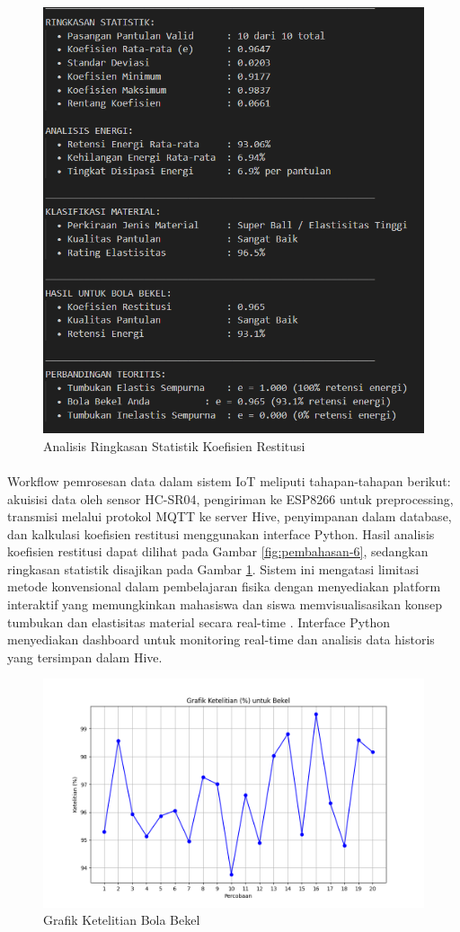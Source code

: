 \begin{figure}[!htbp]
    \centering
    \includegraphics[width=0.5\linewidth]{images/Analisis-Ringkasan-Statistik.png}
    \caption{Analisis Ringkasan Statistik Koefisien Restitusi}
    \label{fig:pembahasan-7}
\end{figure}

\paragraph{}Workflow pemrosesan data dalam sistem IoT meliputi tahapan-tahapan berikut: akuisisi data oleh sensor HC-SR04, pengiriman ke ESP8266 untuk preprocessing, transmisi melalui protokol MQTT ke server Hive, penyimpanan dalam database, dan kalkulasi koefisien restitusi menggunakan interface Python. Hasil analisis koefisien restitusi dapat dilihat pada Gambar \ref{fig:pembahasan-6}, sedangkan ringkasan statistik disajikan pada Gambar \ref{fig:pembahasan-7}. Sistem ini mengatasi limitasi metode konvensional dalam pembelajaran fisika dengan menyediakan platform interaktif yang memungkinkan mahasiswa dan siswa memvisualisasikan konsep tumbukan dan elastisitas material secara real-time \citep{anderson2019digital}. Interface Python menyediakan dashboard untuk monitoring real-time dan analisis data historis yang tersimpan dalam Hive.

\begin{figure}[!htbp]
    \centering
    \includegraphics[width=0.5\linewidth]{output_tex/Grafik_ketelitian_Bekel.png}
    \caption{Grafik Ketelitian Bola Bekel}
    \label{fig:grafik-bola-bekel}
\end{figure}

